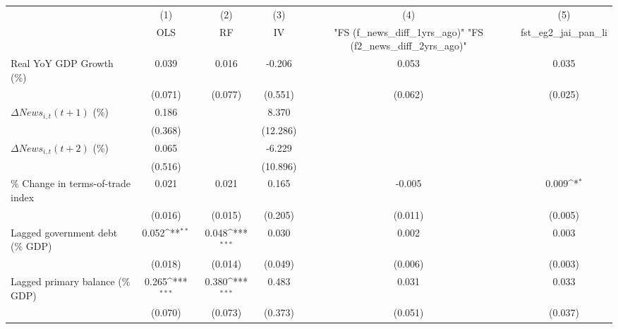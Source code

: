 {
\def\sym#1{\ifmmode^{#1}\else\(^{#1}\)\fi}
\begin{tabular}{l*{5}{c}}
\toprule
                    &\multicolumn{1}{c}{(1)}&\multicolumn{1}{c}{(2)}&\multicolumn{1}{c}{(3)}&\multicolumn{1}{c}{(4)}&\multicolumn{1}{c}{(5)}\\
                    &\multicolumn{1}{c}{OLS}&\multicolumn{1}{c}{RF}&\multicolumn{1}{c}{IV}&\multicolumn{1}{c}{ "FS (f_news_diff_1yrs_ago)"  "FS (f2_news_diff_2yrs_ago)" }&\multicolumn{1}{c}{fst_eg2_jai_pan_li}\\
\midrule
Real YoY GDP Growth (\%)&       0.039         &       0.016         &      -0.206         &       0.053         &       0.035         \\
                    &     (0.071)         &     (0.077)         &     (0.551)         &     (0.062)         &     (0.025)         \\
\addlinespace
$ \Delta News_{i,t}(t+1)$ (\%)&       0.186         &                     &       8.370         &                     &                     \\
                    &     (0.368)         &                     &    (12.286)         &                     &                     \\
\addlinespace
$ \Delta News_{i,t}(t+2)$ (\%)&       0.065         &                     &      -6.229         &                     &                     \\
                    &     (0.516)         &                     &    (10.896)         &                     &                     \\
\addlinespace
\% Change in terms-of-trade index&       0.021         &       0.021         &       0.165         &      -0.005         &       0.009\sym{*}  \\
                    &     (0.016)         &     (0.015)         &     (0.205)         &     (0.011)         &     (0.005)         \\
\addlinespace
Lagged government debt (\% GDP)&       0.052\sym{**} &       0.048\sym{***}&       0.030         &       0.002         &       0.003         \\
                    &     (0.018)         &     (0.014)         &     (0.049)         &     (0.006)         &     (0.003)         \\
\addlinespace
Lagged primary balance (\% GDP)&       0.265\sym{***}&       0.380\sym{***}&       0.483         &       0.031         &       0.033         \\
                    &     (0.070)         &     (0.073)         &     (0.373)         &     (0.051)         &     (0.037)         \\

\end{tabular}}
